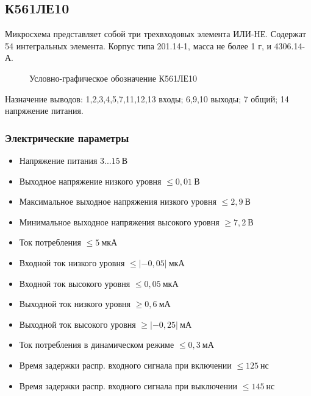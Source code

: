 \subsection*{К561ЛЕ10}

Микросхема представляет собой три трехвходовых элемента ИЛИ-НЕ. Содержат 54 интегральных элемента. Корпус типа 201.14-1, масса не более 1 г, и 4306.14-А.

\begin{figure}[ht]
  
  \caption{Условно-графическое обозначение К561ЛЕ10}
  \label{img:k561le10}
\end{figure}

Назначение выводов: 1,2,3,4,5,7,11,12,13 \longndash входы; 6,9,10 \longndash выходы; 7 \longndash общий; 14 \longndash напряжение питания.

\subsubsection*{Электрические параметры}
\begin{itemize}
	\item[] Напряжение питания \dotfill $3...15~\text{В}$
	\item[] Выходное напряжение низкого уровня \dotfill $\leq 0,01~\text{В}$
	\item[] Максимальное выходное напряжения низкого уровня \dotfill $\leq 2,9~\text{В}$
	\item[] Минимальное выходное напряжения высокого уровня \dotfill $\geq 7,2~\text{В}$
	\item[] Ток потребления \dotfill $\leq 5~\text{мкА}$
	\item[] Входной ток низкого уровня \dotfill $\leq|-0,05|~\text{мкА}$
	\item[] Входной ток высокого уровня \dotfill $\leq 0,05~\text{мкА}$
	\item[] Выходной ток низкого уровня \dotfill $\geq 0,6~\text{мА}$
	\item[] Выходной ток высокого уровня \dotfill $\geq|-0,25|~\text{мА}$
	\item[] Ток потребления в динамическом режиме \dotfill $\leq 0,3~\text{мА}$
	\item[] Время задержки распр. входного сигнала при включении \dotfill $\leq 125~\text{нс}$
	\item[] Время задержки распр. входного сигнала при выключении \dotfill $\leq 145~\text{нс}$
\end{itemize}

